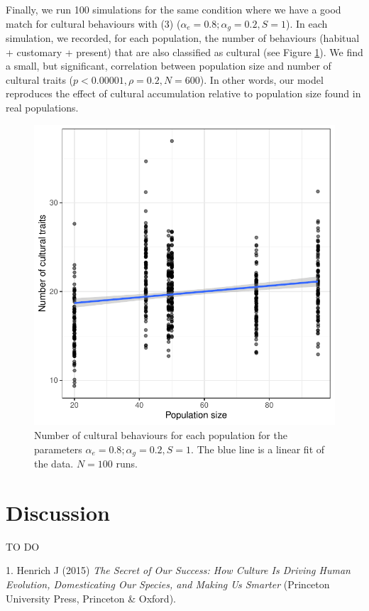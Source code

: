 \documentclass[9pt,twocolumn,twoside,]{pnas-new}
\begin{document}
Finally, we run 100 simulations for the same condition where we have a
good match for cultural behaviours with (3)
(\(\alpha_e=0.8;\alpha_g=0.2, S=1\)). In each simulation, we recorded,
for each population, the number of behaviours (habitual + customary +
present) that are also classified as cultural (see Figure
\ref{Figure4}). We find a small, but significant, correlation between
population size and number of cultural traits
(\(p<0.00001,\rho=0.2,N=600\)). In other words, our model reproduces the
effect of cultural accumulation relative to population size found in
real populations.

\begin{figure}[h!]
\begin{center}
\includegraphics[width=11.4cm]{figures/figure_4.pdf}
\caption{Number of cultural behaviours for each population for the parameters $\alpha_e=0.8;\alpha_g=0.2,S=1$. The blue line is a linear fit of the data. $N=100$ runs.}
\label{Figure4}
\end{center}
\end{figure}

\section*{Discussion}\label{discussion}

TO DO

\showmatmethods
\showacknow
\pnasbreak

\hypertarget{refs}{}
\hypertarget{ref-henrich_secret_2015}{}
1. Henrich J (2015) \emph{The Secret of Our Success: How Culture Is
Driving Human Evolution, Domesticating Our Species, and Making Us
Smarter} (Princeton University Press, Princeton \& Oxford).
\end{document}
